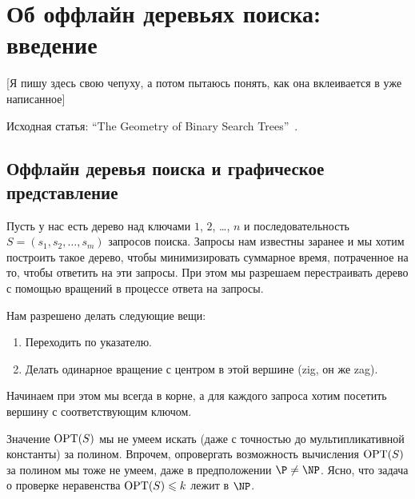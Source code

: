 \section{Об оффлайн деревьях поиска: введение}

[Я пишу здесь свою чепуху, а потом пытаюсь понять, как она вклеивается в уже написанное]

Исходная статья: ``The Geometry of Binary Search Trees''~\cite{demaine2009geometry}.

\subsection{Оффлайн деревья поиска и графическое представление}

Пусть у нас есть дерево над ключами $1$, $2$, \ldots, $n$ и последовательность $S = (s_1, s_2, \ldots, s_m)$ запросов поиска. Запросы нам известны заранее и мы хотим построить такое дерево, чтобы минимизировать суммарное время, потраченное на то, чтобы ответить на эти запросы.
При этом мы разрешаем перестраивать дерево с помощью вращений в процессе
ответа на запросы.

Нам разрешено делать следующие вещи:
\begin{enumerate}
	\item Переходить по указателю.
	\item Делать одинарное вращение с центром в этой вершине (zig, он же zag).
\end{enumerate}

Начинаем при этом мы всегда в корне, а для каждого запроса хотим посетить вершину
с соответствующим ключом.




Значение
$\operatorname{OPT}(S)$ мы не умеем искать (даже с точностью до мультипликативной
константы) за полином. Впрочем, опровергать возможность вычисления $\operatorname{OPT}(S)$
за полином мы тоже не умеем, даже в предположении $\P \neq \NP$. Ясно,
что задача о проверке неравенства $\operatorname{OPT}(S) \leqslant k$ лежит в $\NP$.

